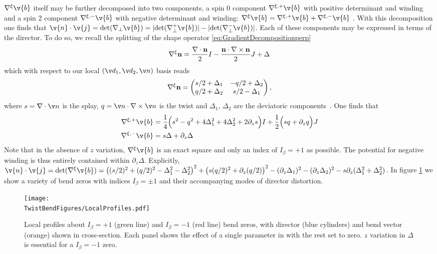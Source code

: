 $\nabla^\xi \v{b}$ itself may be further decomposed into two components, a spin 0 component $\nabla^{\xi, +} \v{b}$ with positive determinant and winding and a spin 2 component $\nabla^{\xi, -} \v{b}$ with negative determinant and winding: $\nabla^\xi \v{b} = \nabla^{\xi,+} \v{b} + \nabla^{\xi,-} \v{b}$ \cite{MachonThesis}. With this decomposition one finds that $\v{n} \cdot \v{j} = \mathrm{det}(\nabla_\perp \v{b}) = |\mathrm{det}(\nabla_\perp^+ \v{b})| - |\mathrm{det}(\nabla_\perp^- \v{b})|$. Each of these components may be expressed in terms of the director. To do so, we recall the splitting of the shape operator \eqref{eq:GradientDecompositionperp}
\begin{align}
    \nabla^\xi {\bf n}= \frac{\nabla \cdot {\bf n}}{2}I - \frac{{\bf n} \cdot \nabla \times {\bf n}}{2} J + \Delta
\end{align} 
which with respect to our local $(\v d_1,\v d_2,\v n)$ basis reads 
\begin{align}
 \nabla^\xi {\bf n}=\begin{pmatrix} s/2 + \Delta_1 & -q/2 + \Delta_2 \\ q/2 + \Delta_2 & s/2 - \Delta_1 \end{pmatrix} ,
\end{align} 
where $s = \nabla \cdot \v n$ is the splay, $q = \v n \cdot \nabla \times \v n$ is the twist and $\Delta_1$, $\Delta_2$ are the deviatoric components~\cite{machon16,selinger19}. One finds that
\begin{align}
\nabla^{\xi,+} \v{b} &=
\frac{1}{4}\Big(s^2 - q^2 + 4\Delta_1^2 + 4\Delta_2^2 +2\partial_z s\Big)I+
\frac{1}{2} \Big(sq + \partial_z q \Big)J  \\
\nabla^{\xi,-} \v{b} &= s \Delta +\partial_z \Delta 
\end{align}
 Note that in the absence of $z$ variation, $\nabla^\xi \v{b}$ is an exact square and only an index of $I_\beta = +1$ as possible. The potential for negative winding is thus entirely contained within $\partial_z \Delta$. Explicitly, $\v{n} \cdot \v{j} = \mathrm{det}(\nabla^\xi \v{b}) = \left( (s/2)^2 +(q/2)^2 -\Delta_1^2 - \Delta_2^2\right)^2 +\left(s(q/2)^2 + \partial_z (q/2)\right)^2 - (\partial_z \Delta_1) ^2 - (\partial_z \Delta_2)^2 - s \partial_z(\Delta_1^2 + \Delta_2^2)$.  In figure \ref{fig:LocalProfiles} we show a variety of bend zeros with indices $I_\beta = \pm 1$ and their accompanying modes of director distortion.

\begin{figure}[htbp]
    \centering
    \texttt{[image: \\TwistBendFigures/LocalProfiles.pdf]}
    \caption{Local profiles about $I_\beta = +1$ (green line) and $I_\beta = -1$ (red line) bend zeros, with director (blue cylinders) and bend vector (orange) shown in cross-section. Each panel shows the effect of a single parameter in  with the rest set to zero. $z$ variation in $\Delta$ is essential for a $I_\beta = -1$ zero.}
    \label{fig:LocalProfiles}
\end{figure}


